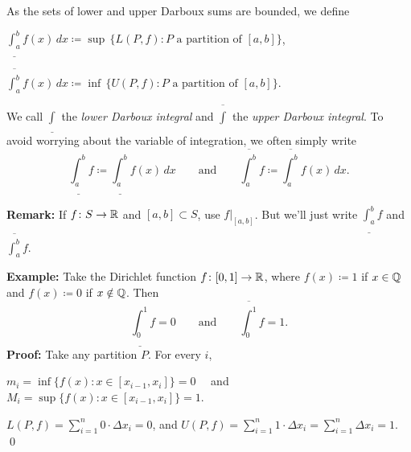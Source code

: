 \documentclass[10pt,aspectratio=169]{beamer}
\begin{document}
\begin{frame}

\begin{definition}
As the sets of lower and upper Darboux sums are bounded, we define

\pause
\medskip

\qquad
$\displaystyle
\underline{\int_a^b} f(x)\,dx \coloneqq
\sup \, \bigl\{ L(P,f) : P \text{ a partition of } [a,b] \bigr\}$,

\pause
\bigskip

\qquad
$\displaystyle
\overline{\int_a^b} f(x)\,dx \coloneqq
\inf \, \bigl\{ U(P,f) : P \text{ a partition of } [a,b] \bigr\}$.

\pause
\medskip

We call $\underline{\int}$
the \emph{lower Darboux integral} and
$\overline{\int}$
the \emph{upper Darboux integral}.
\pause
To avoid worrying about the variable of integration, 
we often simply write
\begin{equation*}
\underline{\int_a^b} f \coloneqq
\underline{\int_a^b} f(x)\,dx 
\qquad \text{and} \qquad
\overline{\int_a^b} f \coloneqq
\overline{\int_a^b} f(x)\,dx  .
\end{equation*}
\end{definition}

\pause
\textbf{Remark:}
If $f \colon S \to {\mathbb{R}}$ and $[a,b] \subset S$,
use $f|_{[a,b]}$.  But we'll just write
$\underline{\int_a^b} f$ and
$\overline{\int_a^b} f$.

\end{frame}

\begin{frame}

\textbf{Example:}
Take the Dirichlet function
$f \colon [0,1] \to {\mathbb{R}}$, where $f(x) \coloneqq 1$ if
$x \in {\mathbb{Q}}$ and $f(x) \coloneqq 0$ if $x \notin {\mathbb{Q}}$.
\pause
Then
\begin{equation*}
\underline{\int_0^1} f = 0 \qquad \text{and} \qquad
\overline{\int_0^1} f = 1 .
\end{equation*}
\pause
\textbf{Proof:}
Take any partition $P$.
\pause
For every $i$,

$m_i = \inf \bigl\{ f(x) : x \in [x_{i-1},x_i] \bigr\} = 0$~~
\pause
and
~~$M_i = \sup \bigl\{ f(x) : x \in [x_{i-1},x_i] \bigr\} = 1$.

\pause
\medskip

\thus \quad
$\displaystyle
L(P,f) = \sum_{i=1}^n 0 \cdot \Delta x_i = 0$,
\pause
\quad and \quad
$\displaystyle
U(P,f) = \sum_{i=1}^n 1 \cdot \Delta x_i = \sum_{i=1}^n \Delta x_i = 1$.
\qed

\end{frame}
\end{document}
